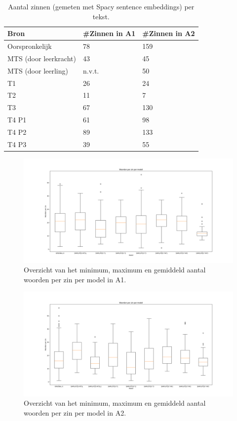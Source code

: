 \begin{table}[h]
	\centering
	\begin{tabular}{ | m{3cm} | m{3cm} | m{3cm} | } 
		\hline
		\textbf{Bron} & \textbf{#Zinnen in A1} & \textbf{#Zinnen in A2} \\
		\hline
		Oorspronkelijk & 78  & 159 \\ 
		\hline
		MTS (door leerkracht) & 43 & 45 \\
		\hline
		MTS (door leerling) & n.v.t. & 50 \\
		\hline
		T1 & 26 & 24 \\
		\hline
		T2 & 11 & 7 \\
		\hline
		T3 & 67 & 130 \\
		\hline
		T4 P1 & 61 & 98 \\
		\hline
		T4 P2 & 89 & 133 \\
		\hline
		T4 P3 & 39 & 55 \\
		\hline
	\end{tabular}
	\caption{Aantal zinnen (gemeten met Spacy sentence embeddings) per tekst.}
	\label{table:resultaten-aantal-zinnen}
\end{table}

\begin{figure}
	\includegraphics[width=\linewidth]{img/boxplot-avg-a1.png}
	\caption{Overzicht van het minimum, maximum en gemiddeld aantal woorden per zin per model in A1.}
	\label{img:boxplot-min-max-avg-words-a1}
\end{figure}

\begin{figure}
	\includegraphics[width=\linewidth]{img/boxplot-avg-a2.png}
	\caption{Overzicht van het minimum, maximum en gemiddeld aantal woorden per zin per model in A2.}
	\label{img:boxplot-min-max-avg-words-a2}
\end{figure}

